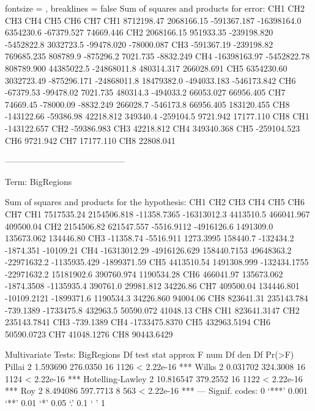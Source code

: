 \documentclass{article}
\begin{document}
\begin{enumerate}[leftmargin = 0 em, label = \arabic*., font = \bfseries]
\begin{enumerate}
\begin{enumerate}
\begin{rcode*}{fontsize = \scriptsize, breaklines = false}
Sum of squares and products for error:
             CH1         CH2         CH3         CH4         CH5         CH6         CH7
CH1   8712198.47  2068166.15 -591367.187 -16398164.0   6354230.6  -67379.527   74669.446
CH2   2068166.15   951933.35 -239198.820  -5452822.8   3032723.5  -99478.020  -78000.087
CH3   -591367.19  -239198.82  769685.235    808789.9   -875296.2    7021.735   -8832.249
CH4 -16398163.97 -5452822.78  808789.900  44385022.5 -24868011.8  480314.317  266028.691
CH5   6354230.60  3032723.49 -875296.171 -24868011.8  18479382.0 -494033.183 -546173.842
CH6    -67379.53   -99478.02    7021.735    480314.3   -494033.2   66053.027   66956.405
CH7     74669.45   -78000.09   -8832.249    266028.7   -546173.8   66956.405  183120.455
CH8   -143122.66   -59386.98   42218.812    349340.4   -259104.5    9721.942   17177.110
             CH8
CH1  -143122.657
CH2   -59386.983
CH3    42218.812
CH4   349340.368
CH5  -259104.523
CH6     9721.942
CH7    17177.110
CH8    22808.041

------------------------------------------
 
Term: BigRegions 

Sum of squares and products for the hypothesis:
             CH1          CH2          CH3         CH4         CH5          CH6         CH7
CH1   7517535.24  2154506.818  -11358.7365 -16313012.3   4413510.5   466041.967   409500.04
CH2   2154506.82   621547.557   -5516.9112  -4916126.6   1491309.0   135673.062   134446.80
CH3    -11358.74    -5516.911    1273.3995    158440.7   -132434.2    -1874.351   -10109.21
CH4 -16313012.29 -4916126.629  158440.7153  49648363.2 -22971632.2 -1135935.429 -1899371.59
CH5   4413510.54  1491308.999 -132434.1755 -22971632.2  15181902.6   390760.974  1190534.28
CH6    466041.97   135673.062   -1874.3508  -1135935.4    390761.0    29981.812    34226.86
CH7    409500.04   134446.801  -10109.2121  -1899371.6   1190534.3    34226.860    94004.06
CH8    823641.31   235143.784    -739.1389  -1733475.8    432963.5    50590.072    41048.13
              CH8
CH1   823641.3147
CH2   235143.7841
CH3     -739.1389
CH4 -1733475.8370
CH5   432963.5194
CH6    50590.0723
CH7    41048.1276
CH8    90443.6429

Multivariate Tests: BigRegions
                 Df test stat approx F num Df den Df     Pr(>F)    
Pillai            2  1.593690 276.0350     16   1126 < 2.22e-16 ***
Wilks             2  0.031702 324.3008     16   1124 < 2.22e-16 ***
Hotelling-Lawley  2 10.816547 379.2552     16   1122 < 2.22e-16 ***
Roy               2  8.494086 597.7713      8    563 < 2.22e-16 ***
---
Signif. codes:  0 ‘***’ 0.001 ‘**’ 0.01 ‘*’ 0.05 ‘.’ 0.1 ‘ ’ 1
\end{rcode*}


\end{enumerate}
\end{enumerate}
\end{enumerate}
\end{document}
